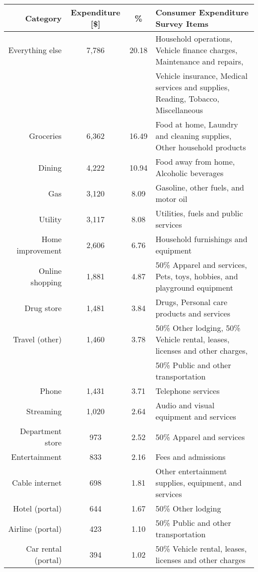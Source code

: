 \begin{table}[t!bh]
    \centering
    \begin{tabular}{ r c c l} 
        \hline
        Category & Expenditure [\$] & \% & Consumer Expenditure Survey Items \\ 
        \hline
        Everything else	& 7,786 & 20.18 & Household operations, Vehicle finance charges, Maintenance and repairs, \\
        & & & Vehicle insurance, Medical services and supplies, Reading, Tobacco, Miscellaneous \\
        Groceries & 6,362 & 16.49 & Food at home, Laundry and cleaning supplies, Other household products \\
        Dining & 4,222 & 10.94 & Food away from home, Alcoholic beverages \\
        Gas	& 3,120	& 8.09 & Gasoline, other fuels, and motor oil \\
        Utility	& 3,117	& 8.08 & Utilities, fuels and public services\\
        Home improvement & 2,606 & 6.76 & Household furnishings and equipment \\
        Online shopping	& 1,881	& 4.87 & 50\% Apparel and services, Pets, toys, hobbies, and playground equipment\\
        Drug store	& 1,481 & 3.84 & Drugs, Personal care products and services \\
        Travel (other) & 1,460 & 3.78 & 50\% Other lodging, 50\% Vehicle rental, leases, licenses and other charges, \\
        & & & 50\% Public and other transportation \\
        Phone & 1,431 & 3.71 & Telephone services\\
        Streaming & 1,020 & 2.64 & Audio and visual equipment and services\\
        Department store & 973 & 2.52 & 50\% Apparel and services \\
        Entertainment & 833 & 2.16 & Fees and admissions \\
        Cable internet & 698 & 1.81 & Other entertainment supplies, equipment, and services \\
        Hotel (portal) & 644 & 1.67 & 50\% Other lodging \\
        Airline (portal) & 423 & 1.10 & 50\% Public and other transportation\\
        Car rental (portal) & 394 & 1.02 & 50\% Vehicle rental, leases, licenses and other charges \\

\end{tabular}
\end{table}
